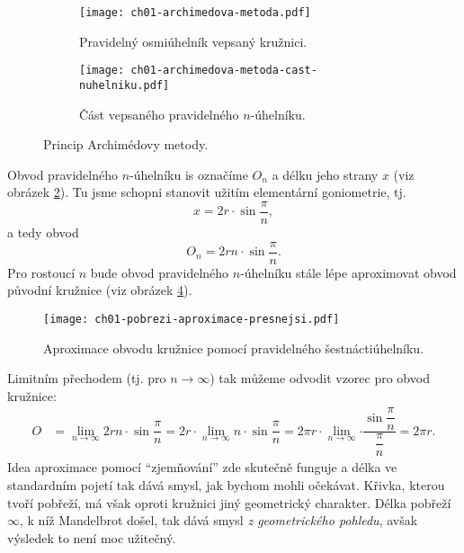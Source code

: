 \begin{figure}[h]
    \centering
    \begin{subfigure}{\subfigwidth}
        \centering
        \texttt{[image: ch01-archimedova-metoda.pdf]}
        \caption{Pravidelný osmiúhelník vepsaný kružnici.}
        \label{subfig:archimedova_metoda}
    \end{subfigure}
    \quad
    \begin{subfigure}{\subfigwidth}
        \centering
        \texttt{[image: ch01-archimedova-metoda-cast-nuhelniku.pdf]}
        \caption{Část vepsaného pravidelného $n$-úhelníku.}
        \label{subfig:archimedova_metoda_cast_nuhelniku}
    \end{subfigure}
    \caption{Princip Archimédovy metody.}
    \label{fig:princip_archimedovy_metody}
\end{figure}
Obvod pravidelného $n$-úhelníku is označíme $O_n$ a délku jeho strany $x$ (viz obrázek \ref{subfig:archimedova_metoda_cast_nuhelniku}). Tu jsme schopni stanovit užitím elementární goniometrie, tj.
\begin{equation*}
    x=2r\cdot\sin{\dfrac{\pi}{n}},
\end{equation*}
a tedy obvod
\begin{equation*}
    O_n=2rn\cdot\sin{\dfrac{\pi}{n}}.
\end{equation*}
Pro rostoucí $n$ bude obvod pravidelného $n$-úhelníku stále lépe aproximovat obvod původní kružnice (viz obrázek \ref{fig:archimedova_metoda_presnejsi}).
\begin{figure}[h]
    \centering
    \texttt{[image: ch01-pobrezi-aproximace-presnejsi.pdf]}
    \caption{Aproximace obvodu kružnice pomocí pravidelného šestnáctiúhelníku.}
    \label{fig:archimedova_metoda_presnejsi}
\end{figure}
Limitním přechodem (tj. pro $n\to\infty$) tak můžeme odvodit vzorec pro obvod kružnice:
\begin{align*}
    O&=\lim_{n\to\infty}{2rn\cdot\sin{\dfrac{\pi}{n}}}=2r\cdot\lim_{n\to\infty}{n\cdot\sin{\dfrac{\pi}{n}}}=2\pi r\cdot\lim_{n\to\infty}{\cdot\dfrac{\sin{\dfrac{\pi}{n}}}{\dfrac{\pi}{n}}}=2\pi r.
\end{align*}
Idea aproximace pomocí ``zjemňování'' zde skutečně funguje a délka ve standardním pojetí tak dává smysl, jak bychom mohli očekávat. Křivka, kterou tvoří pobřeží, má však oproti kružnici jiný geometrický charakter. Délka pobřeží $\infty$, k níž Mandelbrot došel, tak dává smysl \emph{z geometrického pohledu}, avšak výsledek to není moc užitečný.